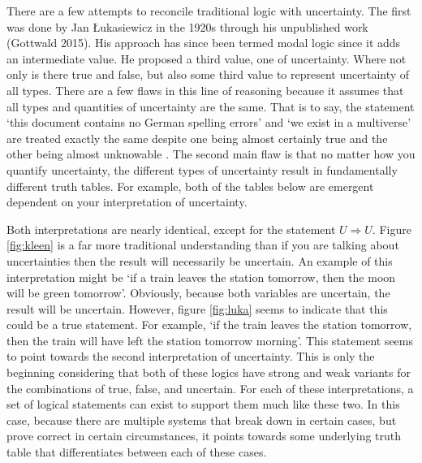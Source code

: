 \documentclass{article}
\begin{document}
There are a few attempts to reconcile traditional logic with uncertainty. The first was done by Jan Łukasiewicz in the 1920s through his unpublished work (Gottwald 2015). His approach has since been termed modal logic since it adds an intermediate value. He proposed a third value, one of uncertainty. Where not only is there true and false, but also some third value to represent uncertainty of all types. There are a few flaws in this line of reasoning because it assumes that all types and quantities of uncertainty are the same. That is to say, the statement ‘this document contains no German spelling errors’ and ‘we exist in a multiverse’ are treated exactly the same despite one being almost certainly true and the other being almost unknowable . The second main flaw is that no matter how you quantify uncertainty, the different types of uncertainty result in fundamentally different truth tables. For example, both of the tables below are emergent dependent on your interpretation of uncertainty.


\begin{figure}[!ht]
    \centering
    \begin{floatrow}
    \end{floatrow}
\end{figure}


Both interpretations are nearly identical, except for the statement $U\Rightarrow U$. Figure \ref{fig:kleen} is a far more traditional understanding than if you are talking about uncertainties then the result will necessarily be uncertain. An example of this interpretation might be ‘if a train leaves the station tomorrow, then the moon will be green tomorrow’. Obviously, because both variables are uncertain, the result will be uncertain. However, figure \ref{fig:luka} seems to indicate that this could be a true statement. For example, ‘if the train leaves the station tomorrow, then the train will have left the station tomorrow morning’. This statement seems to point towards the second interpretation of uncertainty. This is only the beginning considering that both of these logics have strong and weak variants for the combinations of true, false, and uncertain. For each of these interpretations, a set of logical statements can exist to support them much like these two. In this case, because there are multiple systems that break down in certain cases, but prove correct in certain circumstances, it points towards some underlying truth table that differentiates between each of these cases.
\end{document}
